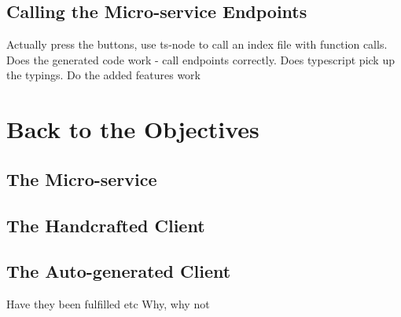 \subsection{Calling the Micro-service Endpoints}
Actually press the buttons, use ts-node to call an index file with function calls. 
Does the generated code work - call endpoints correctly. Does typescript pick up the typings. Do the added features work
\section{Back to the Objectives}
\subsection{The Micro-service}
\subsection{The Handcrafted Client}
\subsection{The Auto-generated Client}
Have they been fulfilled etc
Why, why not